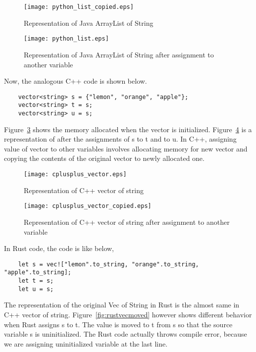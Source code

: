 \begin{figure}[htb]
    \texttt{[image: python\_list\_copied.eps]}
    \caption{Representation of Java ArrayList of String}
    \label{fig:pythonlist}
\end{figure}

\begin{figure}[htb]
    \texttt{[image: python\_list.eps]}
    \caption{Representation of Java ArrayList of String after assignment to another variable}
    \label{fig:pythonlistcopied}
\end{figure}

Now, the analogous C++ code is shown below. 
\begin{lstlisting}
    vector<string> s = {"lemon", "orange", "apple"};
    vector<string> t = s;
    vector<string> u = s;
 \end{lstlisting}
Figure~\ref{fig:cpluscplusvector} shows the memory allocated when the vector is initialized. Figure~\ref{fig:cpluscplusvectorcopied} is a representation of after the assignments of s to t and to u. 
In C++, assigning value of vector to other variables involves allocating memory for new vector and copying the contents of the original vector to newly allocated one. 

\begin{figure}[htb]
    \texttt{[image: cplusplus\_vector.eps]}
    \caption{Representation of C++ vector of string}
    \label{fig:cpluscplusvector}
\end{figure}


\begin{figure}[htb]
    \texttt{[image: cplusplus\_vector\_copied.eps]}
    \caption{Representation of C++ vector of string after assignment to another variable}
    \label{fig:cpluscplusvectorcopied}
\end{figure}


In Rust code, the code is like below, 
\begin{lstlisting}
    let s = vec!["lemon".to_string, "orange".to_string, "apple".to_string];
    let t = s;
    let u = s;
 \end{lstlisting}

The representation of the original Vec of String in Rust is the almost same in C++ vector of string. Figure~\ref{fig:rustvecmoved} however shows different behavior when Rust assigns s to t. 
The value is moved to t from s so that the source variable s is uninitialized. The Rust code actually throws compile error, because we are assigning uninitialized variable at the last line.

